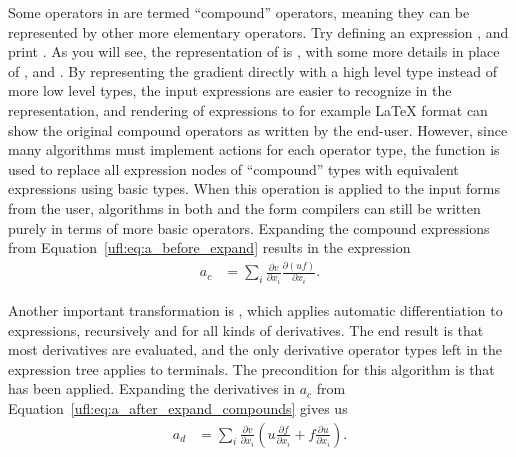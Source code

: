 Some operators in \ufl{} are termed ``compound'' operators, meaning
they can be represented by other more elementary operators.  Try
defining an expression , and print
. As you will see, the representation of  is
, with some more details
in place of ,  and .
By representing the gradient directly with a high
level type  instead of more low level types, the input
expressions are easier to recognize in the representation, and
rendering of expressions to for example \LaTeX{} format can show the
original compound operators as written by the end-user.
However, since many algorithms must implement actions for each
operator type, the function  is used to
replace all expression nodes of ``compound'' types with equivalent
expressions using basic types. When this operation is applied to the
input forms from the user, algorithms in both \ufl{} and the form
compilers can still be written purely in terms of more basic operators.
Expanding the compound expressions from
Equation~\eqref{ufl:eq:a_before_expand} results in the expression
\begin{align} \label{ufl:eq:a_after_expand_compounds}
a_c &= \sum_i \frac{\partial v}{\partial x_i} \frac{\partial (u f)}{\partial x_i}.
\end{align}

Another important transformation is , which
applies automatic differentiation to expressions, recursively and for
all kinds of derivatives.  The end result is that most derivatives are
evaluated, and the only derivative operator types left in the
expression tree applies to terminals. The precondition for this
algorithm is that  has been applied.
Expanding the derivatives in $a_c$ from
Equation~\eqref{ufl:eq:a_after_expand_compounds} gives us
\begin{align} \label{ufl:eq:a_after_expand_derivatives}
a_d &= \sum_{i} \frac{\partial v}{\partial x_i} (u \frac{\partial f}{\partial x_i} + f \frac{\partial u}{\partial x_i}).
\end{align}

